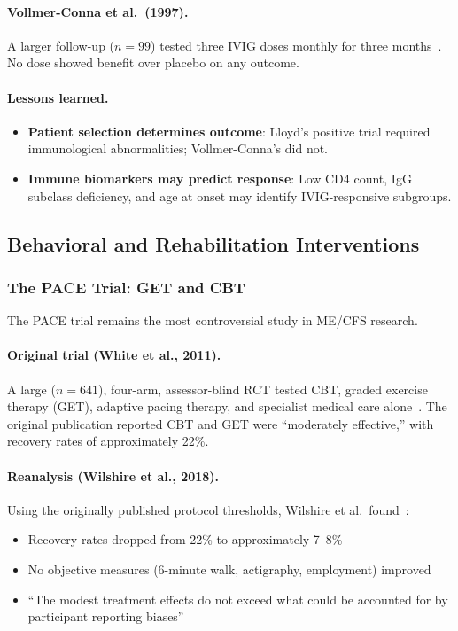 \paragraph{Vollmer-Conna et al.\ (1997).}
A larger follow-up ($n = 99$) tested three IVIG doses monthly for three months~\cite{VollmerConna1997}. No dose showed benefit over placebo on any outcome.

\paragraph{Lessons learned.}
\begin{itemize}
    \item \textbf{Patient selection determines outcome}: Lloyd's positive trial required immunological abnormalities; Vollmer-Conna's did not.
    \item \textbf{Immune biomarkers may predict response}: Low CD4 count, IgG subclass deficiency, and age at onset may identify IVIG-responsive subgroups.
\end{itemize}

\subsection{Behavioral and Rehabilitation Interventions}
\label{subsec:neg-behavioral}

\subsubsection{The PACE Trial: GET and CBT}

The PACE trial remains the most controversial study in ME/CFS research.

\paragraph{Original trial (White et al., 2011).}
A large ($n = 641$), four-arm, assessor-blind RCT tested CBT, graded exercise therapy (GET), adaptive pacing therapy, and specialist medical care alone~\cite{White2011pace}. The original publication reported CBT and GET were ``moderately effective,'' with recovery rates of approximately 22\%.

\paragraph{Reanalysis (Wilshire et al., 2018).}
Using the originally published protocol thresholds, Wilshire et al.\ found~\cite{Wilshire2018}:
\begin{itemize}
    \item Recovery rates dropped from 22\% to approximately 7--8\%
    \item No objective measures (6-minute walk, actigraphy, employment) improved
    \item ``The modest treatment effects do not exceed what could be accounted for by participant reporting biases''
\end{itemize}

